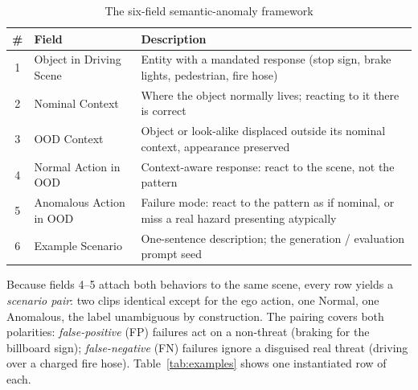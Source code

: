 \documentclass[conference]{IEEEtran}
\begin{document}
\begin{table}[htbp]
\caption{The six-field semantic-anomaly framework}
\begin{center}
\footnotesize
\begin{tabular}{|c|l|p{4.6cm}|}
\hline
\textbf{\#} & \textbf{Field} & \textbf{Description} \\
\hline
1 & Object in Driving Scene & Entity with a mandated response (stop sign, brake lights, pedestrian, fire hose) \\
\hline
2 & Nominal Context & Where the object normally lives; reacting to it there is correct \\
\hline
3 & OOD Context & Object or look-alike displaced outside its nominal context, appearance preserved \\
\hline
4 & Normal Action in OOD & Context-aware response: react to the scene, not the pattern \\
\hline
5 & Anomalous Action in OOD & Failure mode: react to the pattern as if nominal, or miss a real hazard presenting atypically \\
\hline
6 & Example Scenario & One-sentence description; the generation / evaluation prompt seed \\
\hline
\end{tabular}
\label{tab:framework}
\end{center}
\end{table}

Because fields 4--5 attach both behaviors to the same scene, every row yields a \emph{scenario pair}: two clips identical except for the ego action, one Normal, one Anomalous, the label unambiguous by construction. The pairing covers both polarities: \emph{false-positive} (FP) failures act on a non-threat (braking for the billboard sign); \emph{false-negative} (FN) failures ignore a disguised real threat (driving over a charged fire hose). Table~\ref{tab:examples} shows one instantiated row of each.
\end{document}
